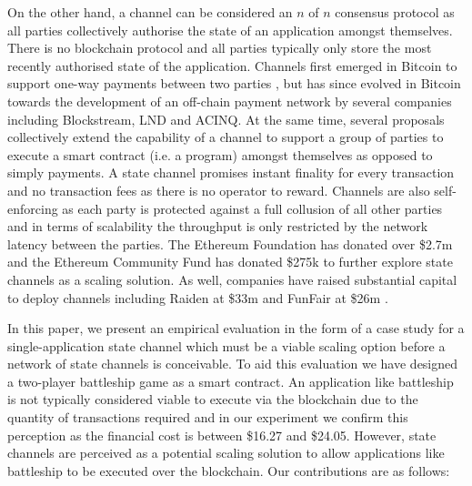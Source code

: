 \documentclass{llncs}
\begin{document}
	On the other hand, a channel can be considered an $n$ of $n$ consensus protocol as all parties collectively authorise the state of an application amongst themselves. 
	There is no blockchain protocol and all parties typically only store the most recently authorised state of the application. 
	Channels first emerged in Bitcoin to support one-way payments between two parties \cite{spilman2013,decker2015fast}, but has since evolved in Bitcoin towards the development of an off-chain payment network \cite{poon2016bitcoin} by several companies including Blockstream, LND and ACINQ. 
	At the same time, several proposals \cite{miller2017sprites,mccorry2018pisa,dziembowski2017perun,statechannelnetworks,coleman2018counterfactual,celernetwork,forcemove} collectively extend the capability of a channel to support a group of parties to execute a smart contract (i.e. a program) amongst themselves as opposed to simply payments. 
	A state channel promises instant finality for every transaction and no transaction fees as there is no operator to reward.
	Channels are also self-enforcing as each party is protected against a full collusion of all other parties and in terms of scalability the throughput is only restricted by the network latency between the parties. 
	The Ethereum Foundation has donated over \$2.7m \cite{efscaling1,efscaling2,efscaling3}  and the Ethereum Community Fund has donated \$275k \cite{ecfscaling} to further explore state channels as a scaling solution.
	As well, companies have raised substantial capital to deploy channels including Raiden at \$33m \cite{raidenICO} and FunFair at \$26m \cite{funfair}.
	
	In this paper, we present an empirical evaluation in the form of a case study for a single-application state channel which must be a viable scaling option before a network of state channels is conceivable. 
	To aid this evaluation we have designed a two-player battleship game as a smart contract.
	An application like battleship is not typically considered viable to execute via the blockchain due to the quantity of transactions required and in our experiment we confirm this perception as the financial cost is between \$16.27 and \$24.05. 
	However, state channels are perceived as a potential scaling solution to allow applications like battleship to be executed over the blockchain. 
	Our contributions are as follows: 
	
\end{document}
